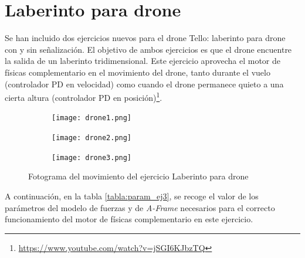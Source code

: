 \newpage
\section{Laberinto para drone}
Se han incluido dos ejercicios nuevos para el drone Tello: laberinto para drone con y sin señalización. El objetivo de ambos ejercicios es que el drone encuentre la salida de un laberinto tridimensional. Este ejercicio aprovecha el motor de físicas complementario en el movimiento del drone, tanto durante el vuelo (controlador PD en velocidad) como cuando el drone permanece quieto a una cierta altura (controlador PD en posición)\footnote{\url{https://www.youtube.com/watch?v=jSGI6KJbzTQ}}. \newline

\begin{figure}[h!]
\begin{subfigure}[b]{0.3\textwidth}
    \texttt{[image: drone1.png]}
  \end{subfigure}
  \hfill
  \hfill
  \begin{subfigure}[b]{0.3\textwidth}
    \texttt{[image: drone2.png]}
  \end{subfigure}
    \hfill
    \hfill
  \begin{subfigure}[b]{0.3\textwidth}
    \texttt{[image: drone3.png]}
  \end{subfigure}
    \hfill
    \caption{Fotograma del movimiento del ejercicio Laberinto para drone}
    \label{fig:laberinto_drone_movimiento}
\end{figure}

A continuación, en la tabla \ref{tabla:param_ej3}, se recoge el valor de los parámetros del modelo de fuerzas y de  \textit{A-Frame} necesarios para el correcto funcionamiento del motor de físicas complementario en este ejercicio.

